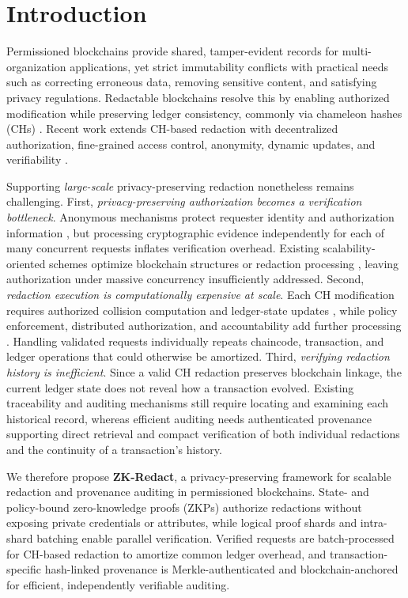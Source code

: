 \documentclass[lettersize,journal]{IEEEtran}
\begin{document}
\section{Introduction}

Permissioned blockchains provide shared, tamper-evident records for
multi-organization applications, yet strict immutability conflicts with
practical needs such as correcting erroneous data, removing sensitive
content, and satisfying privacy regulations. Redactable blockchains
resolve this by enabling authorized modification while preserving ledger
consistency, commonly via chameleon hashes (CHs) \cite{ref1,ref2,ref9}.
Recent work extends CH-based redaction with decentralized authorization,
fine-grained access control, anonymity, dynamic updates, and
verifiability \cite{ref4,ref6,ref14,ref15,ref16,ref20}.

Supporting \emph{large-scale} privacy-preserving redaction nonetheless
remains challenging. First, \emph{privacy-preserving authorization
becomes a verification bottleneck}. Anonymous mechanisms protect
requester identity and authorization information
\cite{ref4,ref14,ref17}, but processing cryptographic evidence
independently for each of many concurrent requests inflates verification
overhead. Existing scalability-oriented schemes optimize blockchain
structures or redaction processing \cite{ref10,ref14,ref21}, leaving
authorization under massive concurrency insufficiently addressed. Second, \emph{redaction execution is computationally expensive at
scale}. Each CH modification requires authorized collision computation
and ledger-state updates \cite{ref1,ref2,ref6,ref19}, while policy
enforcement, distributed authorization, and accountability add further
processing \cite{ref15,ref20}. Handling validated requests
individually repeats chaincode, transaction, and ledger operations that
could otherwise be amortized.
Third, \emph{verifying redaction history is inefficient}. Since a valid
CH redaction preserves blockchain linkage, the current ledger state does
not reveal how a transaction evolved. Existing traceability and
auditing mechanisms \cite{ref10,ref13,ref16,ref20} still require
locating and examining each historical record, whereas efficient
auditing needs authenticated provenance supporting direct retrieval and
compact verification of both individual redactions and the continuity of
a transaction's history.

We therefore propose \textbf{ZK-Redact}, a privacy-preserving framework
for scalable redaction and provenance auditing in permissioned blockchains. State- and policy-bound zero-knowledge proofs (ZKPs) authorize redactions without exposing private credentials or attributes, while logical proof shards and intra-shard batching enable parallel
verification. Verified requests are batch-processed for CH-based redaction to amortize common ledger overhead, and transaction-specific hash-linked provenance is Merkle-authenticated and blockchain-anchored for efficient, independently verifiable auditing.
\end{document}
